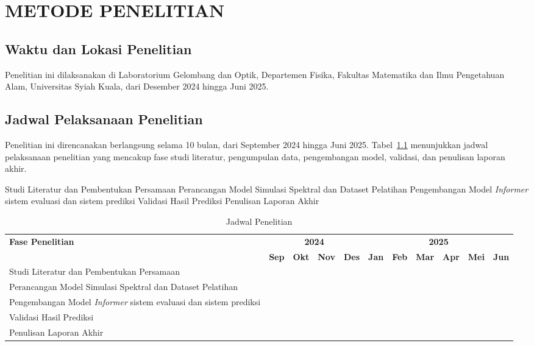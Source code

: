 

\chapter{METODE PENELITIAN}

\section{Waktu dan Lokasi Penelitian}
Penelitian ini dilaksanakan di Laboratorium Gelombang dan Optik, Departemen Fisika, Fakultas Matematika dan Ilmu Pengetahuan Alam, Universitas Syiah Kuala, dari Desember 2024 hingga Juni 2025.

\section{Jadwal Pelaksanaan Penelitian}
Penelitian ini direncanakan berlangsung selama 10 bulan, dari September 2024 hingga Juni 2025. Tabel~\ref{tab:jadwal_penelitian} menunjukkan jadwal pelaksanaan penelitian yang mencakup fase studi literatur, pengumpulan data, pengembangan model, validasi, dan penulisan laporan akhir.

Studi Literatur dan Pembentukan Persamaan
Perancangan Model Simulasi Spektral dan Dataset Pelatihan
Pengembangan Model \textit{Informer} sistem evaluasi dan sistem prediksi
Validasi Hasil Prediksi 
Penulisan  Laporan Akhir

\begin{table}[H]
  \centering
  \caption{Jadwal Penelitian}
  \label{tab:jadwal_penelitian}
  \small
  \begin{tabularx}{\textwidth}{X *{10}{c}}
    \toprule
    \textbf{Fase Penelitian} & \multicolumn{4}{c}{\textbf{2024}} & \multicolumn{6}{c}{\textbf{2025}} \\
    \cmidrule(lr){2-5} \cmidrule(lr){6-11}
    & \textbf{Sep} & \textbf{Okt} & \textbf{Nov} & \textbf{Des} & \textbf{Jan} & \textbf{Feb} & \textbf{Mar} & \textbf{Apr} & \textbf{Mei} & \textbf{Jun} \\
    \midrule
    Studi Literatur dan Pembentukan Persamaan & \cellcolor{gray!20} & \cellcolor{gray!20} & & & & & & & & \\
    Perancangan Model Simulasi Spektral dan Dataset Pelatihan & & & \cellcolor{gray!20} & \cellcolor{gray!20} & & & & & & \\
    Pengembangan Model \textit{Informer} sistem evaluasi dan sistem prediksi & & & & & \cellcolor{gray!20} & \cellcolor{gray!20} & \cellcolor{gray!20} & & & \\
    Validasi Hasil Prediksi & & & & & & & & \cellcolor{gray!20} & \cellcolor{gray!20} & \\
    Penulisan Laporan Akhir & & & & & & & & & \cellcolor{gray!20} & \cellcolor{gray!20} \\
    \bottomrule
  \end{tabularx}
  \vspace{0.2cm}
\end{table}

